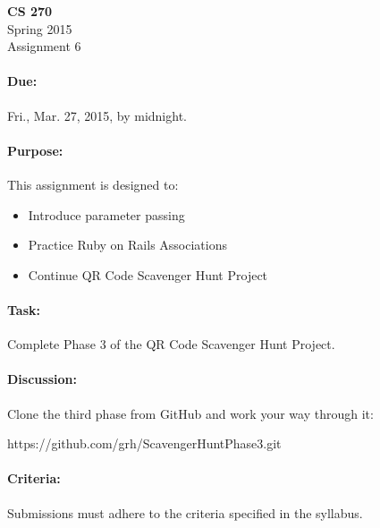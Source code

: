 \documentclass[11pt]{article}
\begin{document}
    \begin{center}

        \large\textbf{CS 270} \\
        Spring 2015 \\
        Assignment 6 \\

    \end{center}

    \paragraph{Due:} Fri., Mar. 27, 2015, by midnight.

    \paragraph{Purpose:} This assignment is designed to:

        \begin{itemize}

            \item Introduce parameter passing

            \item Practice Ruby on Rails Associations

            \item Continue QR Code Scavenger Hunt Project

        \end{itemize}

    \paragraph{Task:} Complete Phase 3 of the QR Code Scavenger Hunt
    Project.
    
    \paragraph{Discussion:} Clone the third phase from
    GitHub and work your way through it:

    \begin{center}

        https://github.com/grh/ScavengerHuntPhase3.git

    \end{center}

    \paragraph{Criteria:} Submissions must adhere to the criteria
    specified in the syllabus.
\end{document}
